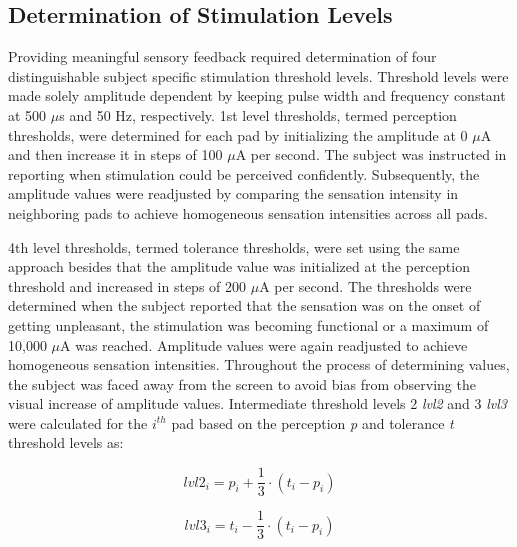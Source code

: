 
\subsection{Determination of Stimulation Levels}


Providing meaningful sensory feedback required determination of four distinguishable subject specific stimulation threshold levels. Threshold levels were made solely amplitude dependent by keeping pulse width and frequency constant at 500 $\mu$s and 50 Hz, respectively.  1st level thresholds, termed perception thresholds, were determined for each pad by initializing the amplitude at 0 $\mu$A and then increase it in steps of 100 $\mu$A per second. The subject was instructed in reporting when stimulation could be perceived confidently. Subsequently, the amplitude values were readjusted by comparing the sensation intensity in neighboring pads to achieve homogeneous sensation intensities across all pads. 

4th level thresholds, termed tolerance thresholds, were set using the same approach besides that the amplitude value was initialized at the perception threshold and increased in steps of 200 $\mu $A per second. The thresholds were determined when the subject reported that the sensation was on the onset of getting unpleasant, the stimulation was becoming functional or a maximum of 10,000 $\mu$A was reached. Amplitude values were again readjusted to achieve homogeneous sensation intensities. Throughout the process of determining values, the subject was faced away from the screen to avoid bias from observing the visual increase of amplitude values. Intermediate threshold levels 2 \textit{lvl2} and 3 \textit{lvl3} were calculated for the $i^{th}$ pad based on the perception \textit{p} and tolerance \textit{t} threshold levels as: 

	\begin{equation}
	lvl2_i = p_i + \frac{1}{3} \cdot (t_i - p_i)
	\end{equation}

	\begin{equation}
	lvl3_i = t_i - \frac{1}{3} \cdot (t_i - p_i)
	\end{equation}
